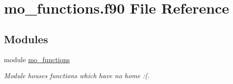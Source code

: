 \hypertarget{mo__functions_8f90}{
\section{mo\_\-functions.f90 File Reference}
\label{mo__functions_8f90}
}
\subsection*{Modules}
\begin{DoxyCompactItemize}
\item 
module \hyperlink{namespacemo__functions}{mo\_\-functions}


\begin{DoxyCompactList}\small\item\em Module houses functions which have no home :(. \item\end{DoxyCompactList}

\end{DoxyCompactItemize}
